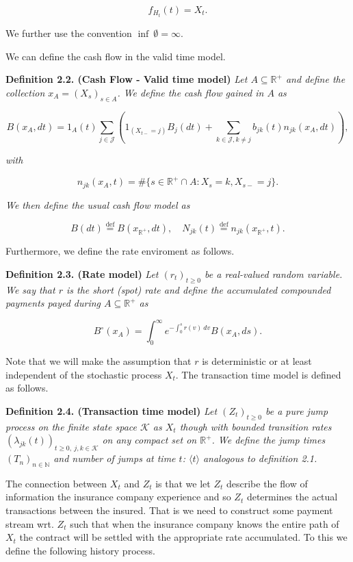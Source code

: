 \documentclass[a4paper,10pt,openany]{book}
\begin{document}
\[
f_{H_t}(t)=X_t.
\]

We further use the convention \(\inf\ \emptyset=\infty\).

We can define the cash flow in the valid time model.

\textbf{Definition 2.2. (Cash Flow - Valid time model)} \emph{Let \(A\subseteq \mathbb R^+\) and define the collection \(x_A=(X_s)_{s\in A}\). We define the cash flow gained in \(A\) as}

\[
B(x_A,dt)=1_A(t)\sum_{j\in \mathcal J}\left(1_{(X_{t-}=j)}B_j(dt)+\sum_{k\in \mathcal J, k\ne j}b_{jk}(t)n_{jk}(x_A,dt)\right),
\]

\emph{with}

\[
n_{jk}(x_A,t)=\#\Big\{s\in \mathbb R^+\cap A : X_s=k,X_{s-}=j\Big\}.
\]

\emph{We then define the usual cash flow model as}

\[
B(dt)\stackrel{\text{def}}{=}B(x_{\mathbb R^+},dt),\quad N_{jk}(t)\stackrel{\text{def}}{=}n_{jk}(x_{\mathbb R^+},t).
\]

Furthermore, we define the rate enviroment as follows.

\textbf{Definition 2.3. (Rate model)} \emph{Let \((r_t)_{t\ge 0}\) be a real-valued random variable. We say that \(r\) is the short (spot) rate and define the accumulated compounded payments payed during \(A\subseteq \mathbb R^+\) as}

\[
B^\circ(x_A)=\int_0^\infty e^{-\int_0^sr(v)\ dv} B(x_A,ds).
\]

Note that we will make the assumption that \(r\) is deterministic or at least independent of the stochastic process \(X_t\). The transaction time model is defined as follows.

\textbf{Definition 2.4. (Transaction time model)} \emph{Let \((Z_t)_{t\ge 0}\) be a pure jump process on the finite state space \(\mathcal K\) as \(X_t\) though with bounded transition rates \((\lambda_{jk}(t))_{t\ge 0,\ j,k\in \mathcal K}\) on any compact set on \(\mathbb R^+\). We define the jump times \((T_n)_{n\in \mathbb N}\) and number of jumps at time \(t\): \(\langle t\rangle\) analogous to definition 2.1.}

The connection between \(X_t\) and \(Z_t\) is that we let \(Z_t\) describe the flow of information the insurance company experience and so \(Z_t\) determines the actual transactions between the insured. That is we need to construct some payment stream wrt. \(Z_t\) such that when the insurance company knows the entire path of \(X_t\) the contract will be settled with the appropriate rate accumulated. To this we define the following history process.
\end{document}

